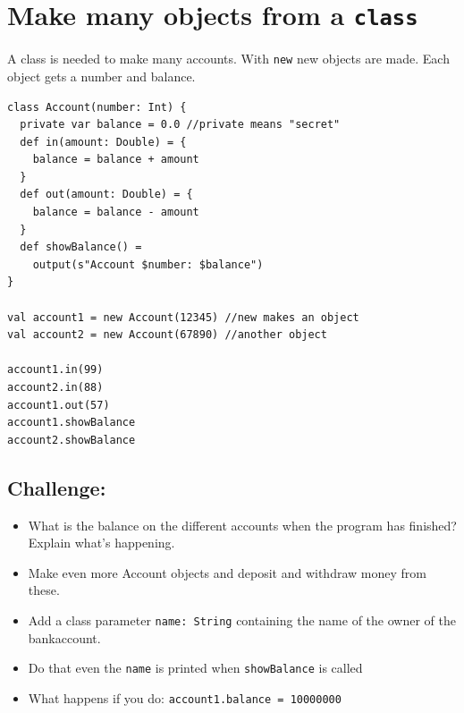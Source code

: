 \chapter{Make many objects from a \lstinline{class}}
\begin{multicols}{2}
A class is needed to make many accounts. With \lstinline{new} new objects are made. Each object gets a number and balance.

\begin{lstlisting}[basicstyle={\ttfamily\fontsize{13}{16}\selectfont},numbers=none]
class Account(number: Int) {
  private var balance = 0.0 //private means "secret"  
  def in(amount: Double) = {
    balance = balance + amount
  }
  def out(amount: Double) = {
    balance = balance - amount
  }
  def showBalance() = 
    output(s"Account $number: $balance")
}

val account1 = new Account(12345) //new makes an object
val account2 = new Account(67890) //another object

account1.in(99)
account2.in(88)
account1.out(57)
account1.showBalance
account2.showBalance
\end{lstlisting}
        


\columnbreak


\section*{\color{BrickRed}Challenge:}


\begin{itemize}

\item {What is the balance on the different accounts when the program has finished? Explain what's happening.}
\item {Make even more Account objects and deposit and withdraw money from these.}
\item {Add a class parameter \lstinline{name: String} containing the name of the owner of the bankaccount.}
\item {Do that even the \lstinline{name} is printed when \lstinline{showBalance} is called}
\item {What happens if you do: \lstinline{account1.balance = 10000000 }}

\end{itemize}


\end{multicols}

